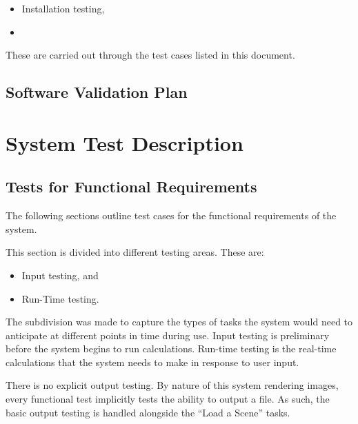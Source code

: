 \documentclass[12pt, titlepage]{article}
\begin{document}
\begin{itemize}
	\item Installation testing,
	\item 
\end{itemize}

These are carried out through the test cases listed in this document.

%

\subsection{Software Validation Plan}


\section{System Test Description}
	
\subsection{Tests for Functional Requirements}
The following sections outline test cases for the functional requirements of 
the system.

This section is divided into different testing areas. These are:

\begin{itemize}
	\item Input testing, and
	\item Run-Time testing.
\end{itemize}

The subdivision was made to capture the types of tasks the system would need to 
anticipate at different points in time during use. Input testing is preliminary 
before the system begins to run calculations. Run-time testing is the real-time 
calculations that the system needs to make in response to user input.

There is no explicit output testing. By nature of this system rendering images, 
every functional test implicitly tests the ability to output a file. As such, 
the basic output testing is handled alongside the ``Load a Scene'' tasks.
\end{document}
